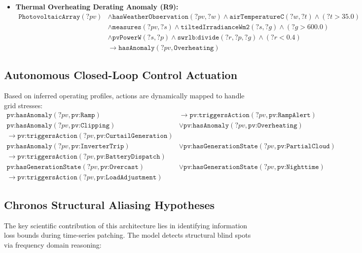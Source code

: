 \begin{itemize}
    \item \textbf{Thermal Overheating Derating Anomaly (R9):}
    \begin{equation}
    \begin{aligned}
    \texttt{PhotovoltaicArray}(?pv) &\wedge \texttt{hasWeatherObservation}(?pv, ?w) \wedge \texttt{airTemperatureC}(?w, ?t) \wedge (?t > 35.0) \\
    &\wedge \texttt{measures}(?pv, ?s) \wedge \texttt{tiltedIrradianceWm2}(?s, ?g) \wedge (?g > 600.0) \\
    &\wedge \texttt{pvPowerW}(?s, ?p) \wedge \texttt{swrlb:divide}(?r, ?p, ?g) \wedge (?r < 0.4) \\
    &\longrightarrow \texttt{hasAnomaly}(?pv, \texttt{Overheating})
    \end{aligned}
    \end{equation}
\end{itemize}

\subsection{Autonomous Closed-Loop Control Actuation}
Based on inferred operating profiles, actions are dynamically mapped to handle grid stresses:
\begin{align}
\texttt{pv:hasAnomaly}(?pv, \texttt{pv:Ramp}) &\longrightarrow \texttt{pv:triggersAction}(?pv, \texttt{pv:RampAlert}) \\
\texttt{pv:hasAnomaly}(?pv, \texttt{pv:Clipping}) &\vee \texttt{pv:hasAnomaly}(?pv, \texttt{pv:Overheating}) \\ \longrightarrow \texttt{pv:triggersAction}(?pv, \texttt{pv:CurtailGeneration}) \\
\texttt{pv:hasAnomaly}(?pv, \texttt{pv:InverterTrip}) &\vee \texttt{pv:hasGenerationState}(?pv, \texttt{pv:PartialCloud}) \\ \longrightarrow \texttt{pv:triggersAction}(?pv, \texttt{pv:BatteryDispatch}) \\
\texttt{pv:hasGenerationState}(?pv, \texttt{pv:Overcast}) &\vee \texttt{pv:hasGenerationState}(?pv, \texttt{pv:Nighttime}) \\ \longrightarrow \texttt{pv:triggersAction}(?pv, \texttt{pv:LoadAdjustment})
\end{align}

\subsection{Chronos Structural Aliasing Hypotheses}
The key scientific contribution of this architecture lies in identifying information loss bounds during time-series patching. The model detects structural blind spots via frequency domain reasoning:

